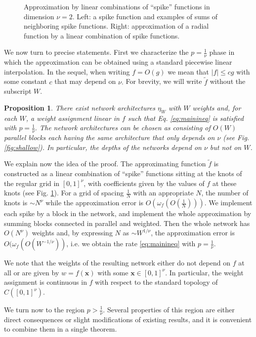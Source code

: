 \documentclass[final, 12pt]{colt2018}
\newtheorem{prop}{Proposition}
\begin{document}
\begin{figure}[t]
\begin{center}
\caption{Approximation by linear combinations of ``spike'' functions in dimension $\nu=2$. Left: a spike function and examples of sums of neighboring spike functions. Right: approximation of a radial function by a linear combination of spike functions.}\label{fig:spikes}
\end{center}
\end{figure}

We now turn to precise statements. First we characterize the $p=\frac{1}{\nu}$ phase in which the approximation can be obtained using a standard piecewise linear interpolation. In the sequel, when writing $f=O(g)$ we mean that $|f|\le c g$ with some constant $c$ that may depend on $\nu.$  For brevity, we will write $\widetilde f$ without the subscript $W$.  

\begin{prop}\label{prop:shallow} There exist network architectures $\eta_W$ with $W$ weights and, for each $W$, a weight assignment linear in $f$ such that Eq. \eqref{eq:mainineq} is satisfied with $p=\frac{1}{\nu}.$  
The network architectures can be chosen as consisting of $O(W)$ parallel blocks each having the same architecture that only depends on $\nu$ (see Fig. \ref{fig:shallow}). In particular, the depths of the networks depend on $\nu$ but not on $W$. 
\end{prop}
We explain now the idea of the proof. The approximating function $\widetilde f$ is constructed as a linear combination of ``spike'' functions sitting at the knots of the regular grid in $[0,1]^\nu$, with coefficients given by the values of $f$ at these knots (see Fig. \ref{fig:spikes}). For a grid of spacing $\frac{1}{N}$ with an appropriate $N$, the number of knots is $\sim N^\nu$ while the approximation error is $O( \omega_f(O(\frac{1}{N}))).$ We implement each spike by a block in the network, and implement the whole approximation by summing blocks connected in parallel and weighted. Then the whole network has $O(N^\nu)$ weights and, by expressing $N$ as $\sim W^{1/\nu}$, the approximation error is $O(\omega_f(O(W^{-1/\nu}))$, i.e. we obtain the rate \eqref{eq:mainineq} with $p=\frac{1}{\nu}$.

We note that the weights of the resulting network either do not depend on $f$ at all or are given by $w=f(\mathbf x)$ with some $\mathbf x\in [0,1]^\nu.$ In particular, the weight assignment is continuous in $f$ with respect to the standard topology of $C([0,1]^\nu)$.   

We turn now to the region $p>\frac{1}{\nu}.$ Several properties of this region are either direct consequences or slight modifications of existing results, and it is convenient to combine them in a single theorem.
\end{document}
